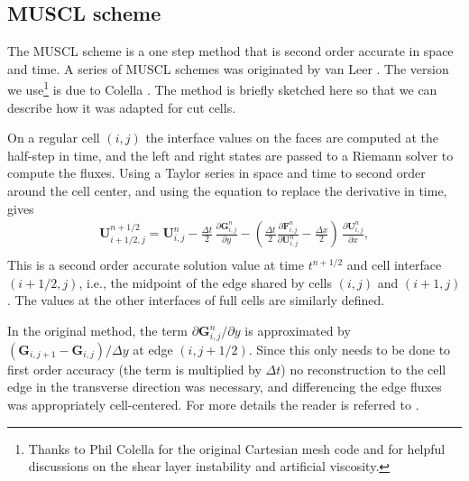 \subsection{MUSCL scheme} \label{sec:muscl}
The MUSCL scheme is a one step method that is second order accurate in
space and time. A series of MUSCL schemes  was originated by van Leer 
\cite{vanleer:muscl}. The version we use\footnote{Thanks to Phil 
Colella for the original Cartesian mesh code and for helpful discussions on the shear
layer instability and artificial viscosity.}
is due to Colella \cite{Colella:Unsplit}.
The method is briefly sketched here so that we can describe how it was
adapted for cut cells. 

On a regular cell $(i,j)$ the interface values on the 
faces are computed at the half-step in time, and the left and right states
are passed to a Riemann
solver to compute the fluxes.
Using a Taylor series in space and time to second order around the
cell center, and using the equation to replace the derivative in time, gives 
\begin{equation}\label{taylor}
\begin{split}
\mathbf{U}_{i+1/2,j}^{n+1/2}   = \mathbf{U}_{i,j}^n - \frac{\Delta t}{2} \, 
             \frac{\partial \mathbf{G}_{i,j}^n}{\partial y}  -
            \left( \frac{\Delta t}{2} 
            \frac{\partial \mathbf{F}_{i,j}^n}{\partial \mathbf{U}^n_{i,j}} -
             \frac{\Delta x}{2} \right) \,\frac{\partial \mathbf{U}_{i,j}^n}{\partial x}, \\[.08in]
\end{split}
\end{equation}
  This is a second order accurate solution value at time $t^{n+1/2}$ and cell interface $(i+1/2,j)$, i.e., the midpoint of the edge shared by cells $(i,j)$ and $(i+1,j)$.
The values at the other interfaces of full cells are similarly defined.


In the original method, the term $\partial \mathbf{G}_{i,j}^n / \partial y$ is approximated by $(\mathbf{G}_{i,j+1} - \mathbf{G}_{i,j})/\Delta y$ at edge $(i,j+1/2)$.
Since this only needs to be done to first order accuracy (the term is multiplied
by $\Delta t$)  no reconstruction to the cell edge  in the transverse 
direction was necessary,
and differencing the edge fluxes was appropriately cell-centered.
For more details the reader is referred to \cite{Colella:Unsplit}.

